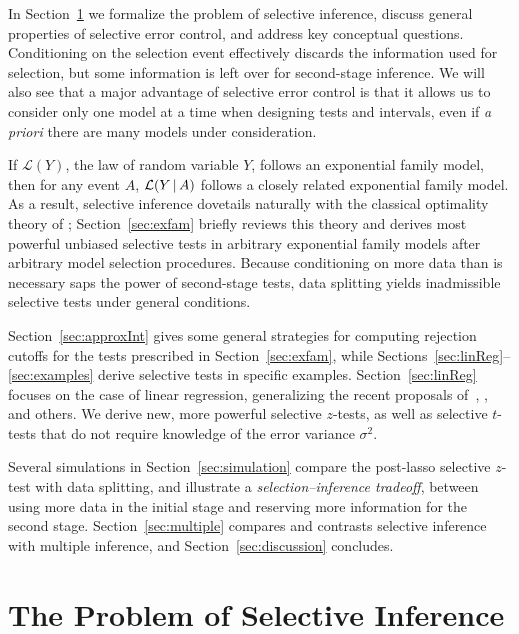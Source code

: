 \documentclass{article}
\theoremstyle{definition}
\newcommand{\cL}{\mathcal{L}}
\newcommand{\sampOrData}{data }
\begin{document}
In Section~\ref{sec:selInf} we formalize the problem of selective inference, discuss general properties of selective error control, and address key conceptual questions. Conditioning on the selection event effectively discards the information used for selection, but some information is left over for second-stage inference. We will also see that a major advantage of selective error control is that it allows us to consider only one model at a time when designing tests and intervals, even if {\em a priori} there are many models under consideration.

If $\cL(Y)$, the law of random variable $Y$, follows an exponential family model, then for any event $A$, $\cL(Y \gv A)$ follows a closely related exponential family model. As a result, selective inference dovetails naturally with the classical optimality theory of \citet{lehmann1955completeness}; Section~\ref{sec:exfam} briefly reviews this theory and derives most powerful unbiased selective tests in arbitrary exponential family models after arbitrary model selection procedures. Because conditioning on more data than is necessary saps the power of second-stage tests, \sampOrData splitting yields inadmissible selective tests under general conditions.

Section~\ref{sec:approxInt} gives some general strategies for
computing rejection cutoffs for the tests prescribed in Section~\ref{sec:exfam}, while Sections~\ref{sec:linReg}--\ref{sec:examples} derive selective tests in specific examples. Section~\ref{sec:linReg} focuses on the case of linear regression, generalizing the recent proposals of~\citet{tibshirani2014exact}, \citet{lee2016exact}, and others. We
derive new, more powerful selective $z$-tests, as well as selective $t$-tests that do not require knowledge of the error variance $\sigma^2$.

Several simulations in Section~\ref{sec:simulation} compare the post-lasso selective $z$-test with \sampOrData splitting, and illustrate a {\em selection--inference tradeoff}, between using more data in the initial stage and reserving more information for the second stage. Section~\ref{sec:multiple} compares and contrasts selective inference with multiple inference, and Section~\ref{sec:discussion} concludes.

\section{The Problem of Selective Inference}\label{sec:selInf}
\end{document}
